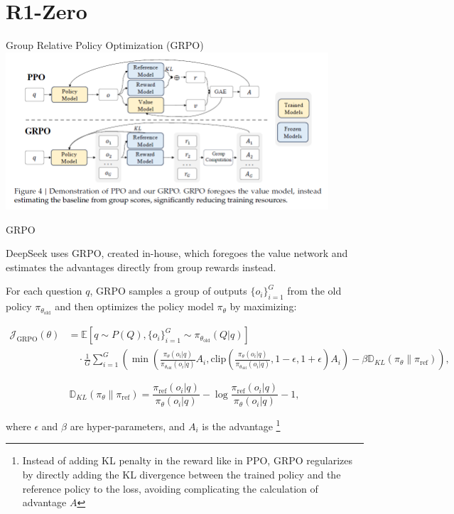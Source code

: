 \documentclass[8pt]{beamer}
\begin{document}
\section{R1-Zero}

\begin{frame}{Group Relative Policy Optimization (GRPO)}
\centering
\includegraphics[width=0.9\textwidth]{figures/grpo.png}
\end{frame}

\begin{frame}{GRPO}

DeepSeek uses GRPO, created in-house, which foregoes the value network and estimates the advantages directly from group rewards instead.

\vspace{1em}

For each question $q$, GRPO samples a group of outputs $\{o_i\}_{i=1}^G$ from the old policy $\pi_{\theta_{\text{old}}}$ and then optimizes the policy model $\pi_\theta$ by maximizing:

\begin{align*}
\mathcal{J}_{\text{GRPO}}(\theta) &= \mathbb{E}[q \sim P(Q), \{o_i\}_{i=1}^G \sim \pi_{\theta_{\text{old}}}(Q|q)] \\
&\quad \cdot \frac{1}{G}\sum_{i=1}^G\left(\min\left(\frac{\pi_\theta(o_i|q)}{\pi_{\theta_{\text{old}}}(o_i|q)}A_i, \text{clip}\left(\frac{\pi_\theta(o_i|q)}{\pi_{\theta_{\text{old}}}(o_i|q)}, 1-\epsilon, 1+\epsilon\right)A_i\right) - \beta\mathbb{D}_{KL}(\pi_\theta\|\pi_{\text{ref}})\right), \tag{1}
\end{align*}

\begin{equation*}
\mathbb{D}_{KL}(\pi_\theta\|\pi_{\text{ref}}) = \frac{\pi_{\text{ref}}(o_i|q)}{\pi_\theta(o_i|q)} - \log\frac{\pi_{\text{ref}}(o_i|q)}{\pi_\theta(o_i|q)} - 1, \tag{2}
\end{equation*}

where $\epsilon$ and $\beta$ are hyper-parameters, and $A_i$ is the advantage \footnote{Instead of adding KL
penalty in the reward like in PPO, GRPO regularizes by directly adding the KL divergence between the
trained policy and the reference policy to the loss, avoiding complicating the calculation of advantage $A$}
\end{frame}
\end{document}
